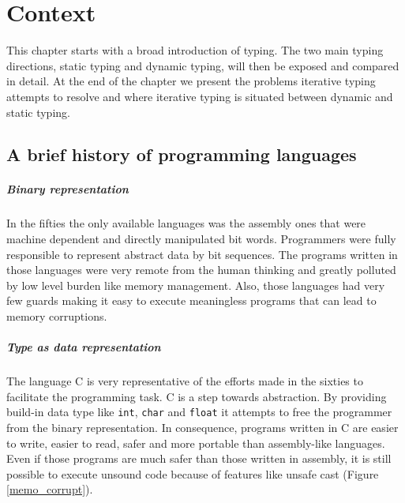 \documentclass[a4paper]{report}
\newcommand{\icansi}[1]{\colorbox{white}{\lstinline[language=code]&#1&}} %
\newcommand{\reffig}[1]{(Figure \ref{#1})}
\begin{document}
\chapter{Context\label{ch_context}}

This chapter starts with a broad introduction of typing. The two main typing directions, static typing and dynamic typing, will then be exposed and compared in detail. At the end of the chapter we present the problems iterative typing attempts to resolve and where iterative typing is situated between dynamic and static typing.

\section{A brief history of programming languages}

\paragraph{Binary representation} In the fifties the only available languages was the assembly ones that were machine dependent and directly manipulated bit words. Programmers were fully responsible to represent abstract data by bit sequences. The programs written in those languages were very remote from the human thinking and greatly polluted by low level burden like memory management. Also, those languages had very few guards making it easy to execute meaningless programs that can lead to memory corruptions.
 
\paragraph{Type as data representation} The language C is very representative of the efforts made in the sixties to facilitate the programming task. C is a step towards abstraction. By providing build-in data type like \icansi{int}, \icansi{char} and \icansi{float} it attempts to free the programmer from the binary representation. In consequence, programs written in C are easier to write, easier to read, safer and more portable than assembly-like languages. Even if those programs are much safer than those written in assembly, it is still possible to execute unsound code because of features like unsafe cast \reffig{memo_corrupt}.
\end{document}
